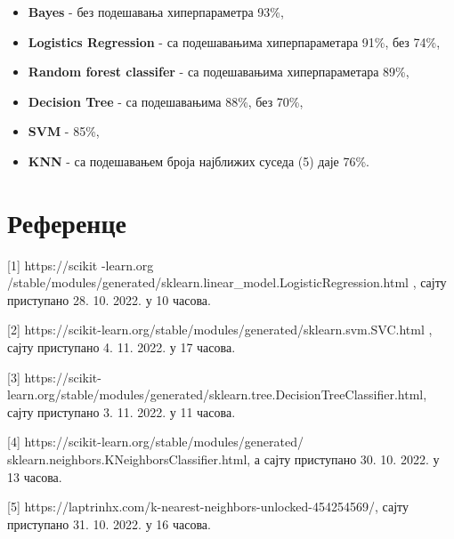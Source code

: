 \documentclass[11pt]{article} %
\begin{document}
\begin{itemize}
    \item \textbf{Bayes} - без подешавања хиперпараметра 93\%,
    \item \textbf{Logistics Regression} - са подешавањима хиперпараметара 91\%, без 74\%, 
    \item \textbf{Random forest classifer} - са подешавањима хиперпараметара 89\%,
    \item \textbf{Decision Tree} - са подешавањима 88\%, без 70\%,
    \item \textbf{SVM} - 85\%,
    \item \textbf{KNN} - са подешавањем броја најближих суседа (5) даје 76\%.
\end{itemize}

\newpage
\section{Референце}
[1] https://scikit -learn.org /stable/modules/generated/sklearn.linear\_model.LogisticRegression.html , сајту приступано 28. 10. 2022. у 10 часова.

[2] https://scikit-learn.org/stable/modules/generated/sklearn.svm.SVC.html , сајту приступано 4. 11. 2022. у 17 часова.

[3] https://scikit-learn.org/stable/modules/generated/sklearn.tree.DecisionTreeClassifier.html, сајту приступано 3. 11. 2022. у 11 часова.

[4] https://scikit-learn.org/stable/modules/generated/ sklearn.neighbors.KNeighborsClassifier.html, а сајту приступано 30. 10. 2022. у 13 часова.

[5] https://laptrinhx.com/k-nearest-neighbors-unlocked-454254569/, сајту приступано 31. 10. 2022. у 16 часова.
\end{document}
